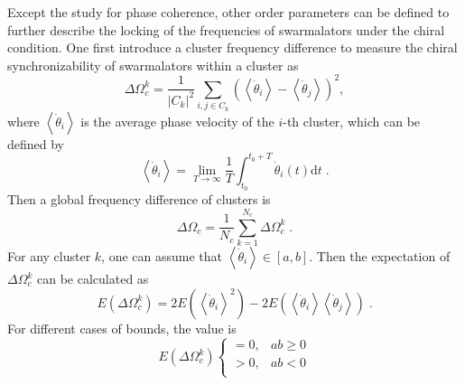 \documentclass{article}
\begin{document}
Except the study for phase coherence, other order parameters can be defined to further describe the locking of the frequencies of swarmalators under the chiral condition. One first introduce a cluster frequency difference to measure the chiral synchronizability of swarmalators within a cluster as
\begin{equation}
    \Delta \Omega_c^k = \frac{1}{\left| C_k \right|^2}\sum_{i,j\in C_k}{\left( \left< \dot{\theta}_i \right> -\left< \dot{\theta}_j \right> \right) ^2} ,
    \label{eq:clusterfrequency}
\end{equation}
where $\left< \dot{\theta}_i \right>$ is the average phase velocity of the $i$-th cluster, which can be defined by
\begin{equation}
    \left< \dot{\theta}_i \right> =\lim_{T\rightarrow \infty} \frac{1}{T}\int_{t_0}^{t_0+T}{\dot{\theta}_i\left( t \right) \mathrm{d}t}\;.
    \label{eq:frequency}
\end{equation}
Then a global frequency difference of clusters is
\begin{equation}
    \Delta \Omega_c =\frac{1}{N_c}\sum_{k=1}^{N_c} {\Delta \Omega_c^k}\;.
    \label{eq:globalcluster}
\end{equation}
For any cluster $k$, one can assume that $\left< \dot{\theta}_i \right>\in \left[a, b\right]$. Then the expectation of $\Delta \Omega_c^k$ can be calculated as
\begin{equation}
    E\left( \Delta \Omega _{c}^{k} \right) =2E\left( \left< \dot{\theta}_i \right> ^2 \right) -2E\left( \left< \dot{\theta}_i \right> \left< \dot{\theta}_j \right> \right)\;.
\end{equation}
For different cases of bounds, the value is
\begin{equation}
    E\left( \Delta \Omega _{c}^{k} \right) \begin{cases}
        =0,&		ab\geqslant 0\\
        >0,&		ab<0\\
    \end{cases}
\end{equation}
\end{document}
